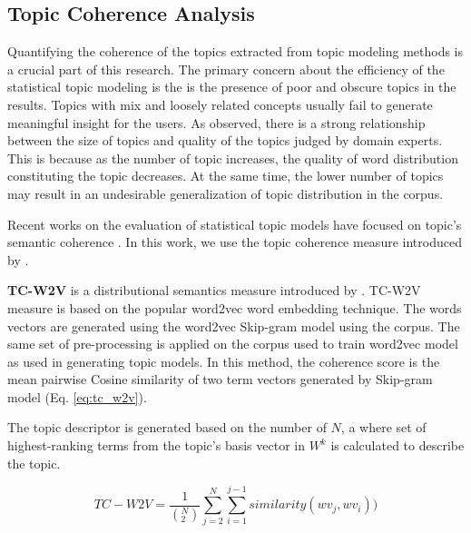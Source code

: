 \subsection{Topic Coherence Analysis}
Quantifying the coherence of the topics extracted from topic modeling methods is a crucial part of this research. The primary concern about the efficiency of the statistical topic modeling is the is the presence of poor and obscure topics in the results.  Topics with mix and loosely related concepts usually fail to generate meaningful insight for the users. As  \cite{Mimno} observed, there is a strong relationship between the size of topics and quality of the topics judged by domain experts. This is because as the number of topic increases, the quality of word distribution constituting the topic decreases. At the same time, the lower number of topics may result in an undesirable generalization of topic distribution in the corpus.  

Recent works on the evaluation of statistical topic models have focused on topic's semantic coherence \cite{Mimno, Ocallaghan, Roder2015}. In this work, we use the topic coherence measure introduced by \cite{Ocallaghan, Roder2015}.

\textbf{TC-W2V} is a distributional semantics measure introduced by \cite{Ocallaghan}. TC-W2V measure is based on the popular word2vec \cite{Mikolov} word embedding technique.  The words vectors are generated using the word2vec Skip-gram model using the corpus.  The same set of pre-processing is applied on the corpus used to train word2vec model as used in generating topic models. In this method, the coherence score is the mean pairwise Cosine similarity of two term vectors generated by Skip-gram model (Eq. \ref{eq:tc_w2v}). 

The topic descriptor is generated based on the number of $N$, a where set of highest-ranking terms from the topic's basis vector in $W^k$ is calculated to describe the topic. 


\begin{equation}\label{eq:tc_w2v}
TC-W2V = \frac{1}{(_{2}^{N})}  \sum_{j=2}^{N} \sum_{i=1}^{j-1} similarity (wv_j, wv_i))
\end{equation}

